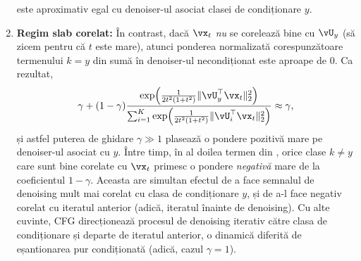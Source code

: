 \documentclass[../../book-main_ro.tex]{subfiles}
\begin{document}
\begin{example}
\begin{enumerate}
      este aproximativ egal cu denoiser-ul asociat clasei de
      condiționare $y$.
    \item \textbf{Regim slab corelat:} În contrast, dacă $\vx_t$
      \textit{nu} se corelează bine cu $\vU_y$ (să zicem pentru că $t$ este mare),
      atunci ponderea normalizată corespunzătoare termenului $k=y$ din sumă în
      denoiser-ul necondiționat este aproape de $0$. Ca rezultat, 
      \begin{equation}
        \gamma + (1 - \gamma) 
      \frac{\exp\rp{\frac{1}{2t^{2}(1
      + t^{2})}\norm{\vU_{y}^{\top}\vx_t}_{2}^{2}}}{\sum_{i
      = 1}^{K}\exp\rp{\frac{1}{2t^{2}(1
      + t^{2})}\norm{\vU_{i}^{\top}\vx_t}_{2}^{2}}}
        \approx \gamma,
      \end{equation}
      și astfel puterea de ghidare $\gamma \gg 1$ plasează o pondere pozitivă mare
      pe denoiser-ul asociat cu $y$.
      Între timp, în al doilea termen din ,
      orice clase $k \neq y$ care sunt bine corelate cu $\vx_t$ 
      primesc o pondere \textit{negativă} mare de la
      coeficientul $1 - \gamma$.
      Aceasta are simultan efectul de a face semnalul de denoising mult
      mai corelat cu clasa de condiționare $y$, și de a-l face negativ
      corelat cu iteratul anterior (adică, iteratul înainte de denoising).
      Cu alte cuvinte, CFG direcționează procesul de denoising iterativ către
      clasa de condiționare și departe de iteratul anterior, o dinamică diferită
      de eșantionarea pur condiționată (adică, cazul $\gamma = 1$).
  \end{enumerate}


\end{example}
\end{document}

